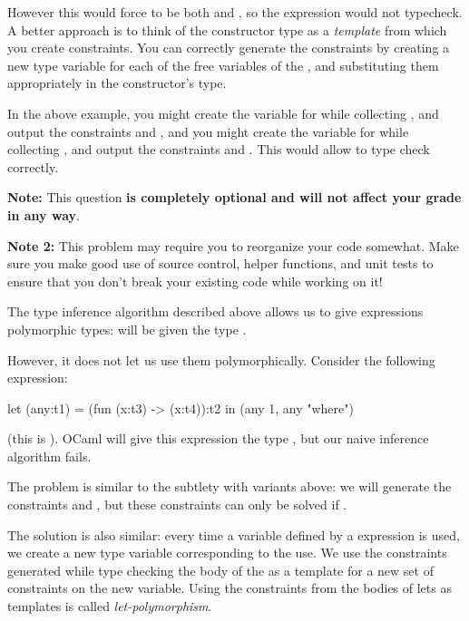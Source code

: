 \documentclass{pset}
\begin{document}
However this would force  to be both  and , so
the expression would not typecheck.  A better approach is to think of the
constructor type as a \emph{template} from which you create constraints.  You
can correctly generate the constraints by creating a new type variable for each
of the free variables of the , and substituting them
appropriately in the constructor's type.

In the above example, you might create the variable  for 
while collecting , and output the constraints  and
, and you might create the variable  for
 while collecting , and output the constraints
 and .  This would allow
 to type check correctly.

\textbf{Note:} This question \textbf{is completely optional and will not affect your grade in
any way}.

\textbf{Note 2:} This problem may require you to reorganize your code somewhat.
Make sure you make good use of source control, helper functions, and unit tests
to ensure that you don't break your existing code while working on it!

The type inference algorithm described above allows us to give expressions
polymorphic types:  will be given the type .

However, it does not let us use them polymorphically.  Consider the following
expression:
\begin{ocaml}
let (any:t1) = (fun (x:t3) -> (x:t4)):t2 in (any 1, any "where")
\end{ocaml}
(this is ).
OCaml will give this expression the type , but our naive
inference algorithm fails.

The problem is similar to the subtlety with variants above: we will generate
the constraints 
and , but these constraints can only
be solved if .

The solution is also similar: every time a variable defined by a 
expression is used, we create a new type variable corresponding to the use.  We
use the constraints generated while type checking the body of the  as
a template for a new set of constraints on the new variable.  Using the
constraints from the bodies of lets as templates is called
\emph{let-polymorphism}.
\end{document}
